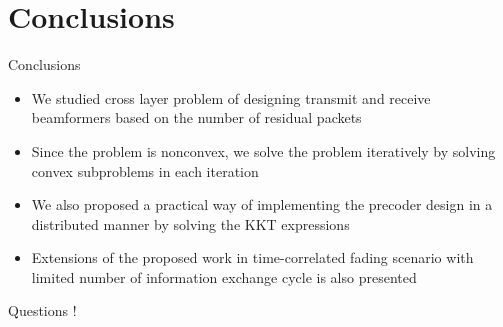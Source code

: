 \documentclass[9pt]{beamer}
\begin{document}
\section{Conclusions}

\begin{frame}{Conclusions}
\begin{itemize}
\item We studied cross layer problem of designing transmit and receive beamformers based on the number of residual packets
\item Since the problem is nonconvex, we solve the problem iteratively by solving convex subproblems in each iteration
\item We also proposed a practical way of implementing the precoder design in a distributed manner by solving the \ac{KKT} expressions
\item Extensions of the proposed work in time-correlated fading scenario with limited number of information exchange cycle is also presented
\end{itemize}
\end{frame}


\begin{frame}
\begin{center}
{\color{blue}\Huge{Questions !}}
\end{center}
\end{frame}
\end{document}
